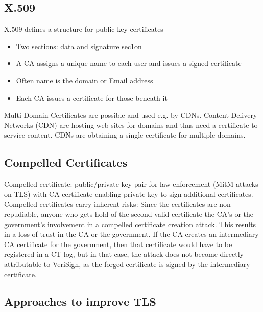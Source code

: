 \documentclass[11pt,oneside,a4paper]{article}
\begin{document}
\subsection{X.509}

X.509 defines a structure for public key certificates

\vspace{-\topsep}
\begin{itemize}
	\setlength{\itemsep}{0pt}
	\setlength{\parskip}{0pt}
	\item Two sections: data and signature sec1on
	\item A CA assigns a unique name to each user and issues a signed certificate
	\item Often name is the domain or Email address
	\item Each CA issues a certificate for those beneath it
\end{itemize}
\vspace{-\topsep}

Multi-Domain Certificates are possible and used e.g. by CDNs. Content Delivery Networks (CDN) are hosting web sites for domains and thus need a certificate to service content. CDNs are obtaining a single certificate for multiple domains.

\subsection{Compelled Certificates}

Compelled certificate: public/private key pair for law enforcement (MitM attacks on TLS) with CA certificate enabling private key to sign additional certificates. Compelled certificates carry inherent risks: Since the certificates are non-repudiable, anyone who gets hold of the second valid certificate the CA's or the government's involvement in a compelled certificate creation attack. This results in a loss of trust in the CA or the government. If the CA creates an intermediary CA certificate for the government, then that certificate would have to be registered in a CT log, but in that case, the attack
does not become directly attributable to VeriSign, as the forged certificate is signed by the intermediary certificate.

\newpage

\subsection{Approaches to improve TLS}
\end{document}
